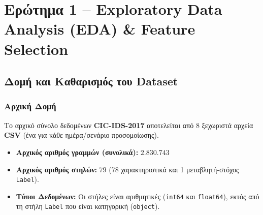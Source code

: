 \documentclass[11pt,a4paper]{article}
\newcommand{\eng}[1]{\textlatin{#1}}
\begin{document}
\newpage

\section{Ερώτημα 1 -- \eng{Exploratory Data Analysis (EDA)} \& \eng{Feature Selection}}

\subsection{Δομή και Καθαρισμός του \eng{Dataset}}

\subsubsection{Αρχική Δομή}
Το αρχικό σύνολο δεδομένων \textbf{\eng{CIC-IDS-2017}} αποτελείται από 8 ξεχωριστά αρχεία \textbf{\eng{CSV}} (ένα για κάθε ημέρα/σενάριο προσομοίωσης). 
\begin{itemize}
    \item \textbf{Αρχικός αριθμός γραμμών (συνολικά):} $2.830.743$
    \item \textbf{Αρχικός αριθμός στηλών:} $79$ (78 χαρακτηριστικά και 1 μεταβλητή-στόχος \texttt{\eng{Label}}).
    \item \textbf{Τύποι Δεδομένων:} Οι στήλες είναι αριθμητικές (\texttt{\eng{int64}} και \texttt{\eng{float64}}), εκτός από τη στήλη \texttt{\eng{Label}} που είναι κατηγορική (\texttt{\eng{object}}).
\end{itemize}
\end{document}
